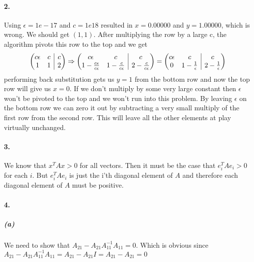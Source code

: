 \documentclass[12pt]{article}
\makeatletter
\newenvironment{amatrix}[1]{%
	\begin{array}{@{}*{#1}{c}|c@{}}
	}{%
	\end{array}
}
\makeatother
\begin{document}
\paragraph{2.}
	Using $\epsilon = 1e-17$ and $c = 1e18$ resulted in $x = 0.00000$ and $y = 1.00000$, which is wrong. We should get $(1,1)$. After multiplying the row by a large c, the algorithm pivots this row to the top and we get 
	\[
	\left(\begin{amatrix}{2}
	c\epsilon & c & c \\
	1 & 1 & 2
	\end{amatrix}\right)
	\Rightarrow
	\left(\begin{amatrix}{2}
	c\epsilon & c & c \\
	1 - \frac{c\epsilon}{c\epsilon} & 1 - \frac{c}{c\epsilon} & 2 - \frac{c}{c\epsilon}
	\end{amatrix}\right)	
	=
	\left(\begin{amatrix}{2}
	c\epsilon & c & c \\
	0 & 1 - \frac{1}{\epsilon} & 2 - \frac{1}{\epsilon}
	\end{amatrix}\right)	
	\]
	performing back substitution gets us $y = 1$ from the bottom row and now the top row will give us $x = 0$. If we don't multiply by some very large constant then $\epsilon$ won't be pivoted to the top and we won't run into this problem. By leaving $\epsilon$ on the bottom row we can zero it out by subtracting a very small multiply of the first row from the second row. This will leave all the other elements at play virtually unchanged.


\paragraph{3.}
	We know that $x^TAx > 0$ for all vectors. Then it must be the case that $e_i^TAe_i > 0$ for each $i$. But $e_i^TAe_i$ is just the i'th diagonal element of $A$ and therefore each diagonal element of $A$ must be positive.
	
	\pagebreak
	
\paragraph{4.}
	\subparagraph{(a)}
		We need to show that $A_{21} - A_{21}A_{11}^{-1}A_{11} = 0$. Which is obvious since $A_{21} - A_{21}A_{11}^{-1}A_{11} = A_{21} - A_{21}I = A_{21} - A_{21} = 0$
	
\end{document}
